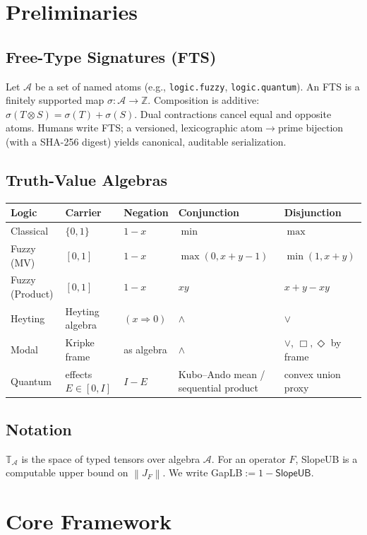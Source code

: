 \documentclass[11pt]{article}
\newcommand{\Z}{\mathbb{Z}}
\newcommand{\norm}[1]{\left\lVert #1 \right\rVert}
\begin{document}
\section{Preliminaries}
\subsection{Free-Type Signatures (FTS)}
Let $\mathcal{A}$ be a set of named atoms (e.g., \texttt{logic.fuzzy}, \texttt{logic.quantum}). An FTS is a finitely supported map $\sigma:\mathcal{A}\to\Z$. Composition is additive: $\sigma(T\otimes S)=\sigma(T)+\sigma(S)$. Dual contractions cancel equal and opposite atoms. Humans write FTS; a versioned, lexicographic atom$\to$prime bijection (with a SHA-256 digest) yields canonical, auditable serialization.

\subsection{Truth-Value Algebras}
\begin{center}
\begin{tabular}{@{}l l l l l@{}}
\toprule
Logic & Carrier & Negation & Conjunction & Disjunction \\
\midrule
Classical & $\{0,1\}$ & $1-x$ & $\min$ & $\max$ \\
Fuzzy (MV) & $[0,1]$ & $1-x$ & $\max(0,x{+}y{-}1)$ & $\min(1,x{+}y)$ \\
Fuzzy (Product) & $[0,1]$ & $1-x$ & $xy$ & $x+y-xy$ \\
Heyting & Heyting algebra & $(x\Rightarrow 0)$ & $\wedge$ & $\vee$ \\
Modal & Kripke frame & as algebra & $\wedge$ & $\vee$, $\Box,\Diamond$ by frame \\
Quantum & effects $E\in[0,I]$ & $I-E$ & Kubo--Ando mean / sequential product & convex union proxy \\
\bottomrule
\end{tabular}
\end{center}

\subsection{Notation}
$\mathbb{T}_\mathcal{A}$ is the space of typed tensors over algebra $\mathcal{A}$. For an operator $F$, \textsf{SlopeUB} is a computable upper bound on $\norm{J_F}$. We write \textsf{GapLB}$:=1-\textsf{SlopeUB}$.

\section{Core Framework}
\end{document}
